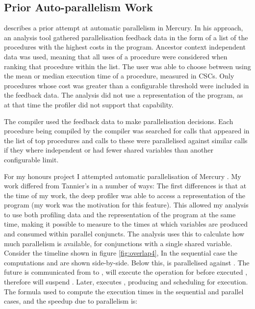 \subsection{Prior Auto-parallelism Work}
\label{sec:backgnd_priorautopar}

\citet{tannier:2007:parallel_mercury} describes a prior attempt at automatic
parallelism in Mercury.
In his approach, 
an analysis tool gathered parallelisation feedback data in the form of
a list of the procedures with the highest costs in the program.
Ancestor context independent data was used,
meaning that all uses of a procedure were considered when ranking that
procedure within the list.
The user was able to choose between using the mean or median
execution time of a procedure, measured in CSCs.
Only procedures whose cost was greater than a configurable threshold were
included in the feedback data.
The analysis did not use a representation of the program,
as at that time the profiler did not support that capability.

The compiler used the feedback data to make parallelisation decisions.
Each procedure being compiled by the compiler was searched for calls that
appeared in the list of top procedures and calls to these were parallelised
against similar calls if they where independent or had fewer shared
variables than another configurable limit.

\label{honours_autopar}
For my honours project I attempted automatic parallelisation of Mercury
\citep{bone:2008:hons}.
My work differed from Tannier's in a number of ways:
The first differences is that at the time of my work,
the deep profiler was able to access a representation of the program
(my work was the motivation for this feature).
This allowed my analysis to use both profiling data and the representation
of the program at the same time,
making it possible to measure to the times at which variables are produced
and consumed within parallel conjuncts.
The analysis uses this to calculate how much parallelism is available,
for conjunctions with a single shared variable.
Consider the timeline shown in figure \ref{fig:overlap4},
In the sequential case the computations  and  are shown
side-by-side.
Below this,  is parallelised against .
The future  is communicated from  to ,
 will execute the \wait operation for 
before  executed \signal, therefore \wait will suspend .
Later,  executes \signal, producing 
and scheduling  for execution.
The formula used to compute the execution times in the sequential and parallel
cases, and the speedup due to parallelism is:

